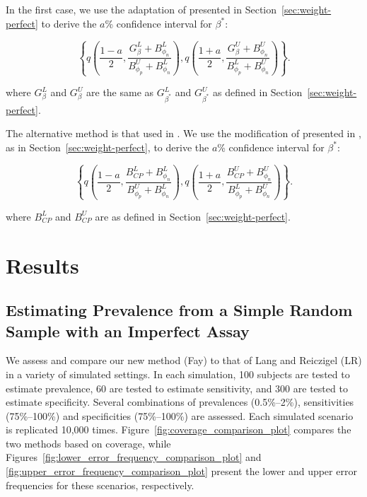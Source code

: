 \documentclass[AMA,STIX1COL]{WileyNJD-v2}
\begin{document}
In the first case, we use the adaptation of \cite{FayF:1997} presented in Section~\ref{sec:weight-perfect} to derive the \( a \)\% confidence interval for \( \beta^* \):

\begin{equation}
    \left\{ q \left( \frac{1 - a}{2}, \frac{G_{\beta}^L + B_{\phi_n}^L }{B_{\phi_p}^U + B_{\phi_n}^L }  \right),  q \left( \frac{1 + a}{2}, \frac{G_{\beta}^U + B_{\phi_n}^U}{B_{\phi_p}^L + B_{\phi_n}^U}  \right) \right\}.
\end{equation}

where \( G_{\beta}^L \) and \( G_{\beta}^U \) are the same as \( G_{\beta^*}^L \) and \( G_{\beta^*}^U \) as defined in Section~\ref{sec:weight-perfect}.

The alternative method is that used in \cite{Kali:2021}.
We use the  modification of \cite{Korn:1998} presented in \cite{Dean:2015}, as in Section~\ref{sec:weight-perfect}, to derive the \( a \)\% confidence interval for \( \beta^* \):

\begin{equation}
    \left\{ q \left( \frac{1 - a}{2}, \frac{B_{CP}^L + B_{\phi_n}^L }{B_{\phi_p}^U + B_{\phi_n}^L }  \right),  q \left( \frac{1 + a}{2}, \frac{B_{CP}^U + B_{\phi_n}^U}{B_{\phi_p}^L + B_{\phi_n}^U}  \right) \right\}.
\end{equation}

where \( B_{CP}^L \) and \( B_{CP}^U \) are as defined in Section~\ref{sec:weight-perfect}.

\section{Results}

\subsection{Estimating Prevalence from a Simple Random Sample with an Imperfect Assay}

We assess and compare our new method (Fay) to that of Lang and Reiczigel (LR) in a variety of simulated settings.
In each simulation, 100 subjects are tested to estimate prevalence, 60 are tested to estimate sensitivity, and 300 are tested to estimate specificity.
Several combinations of prevalences (0.5\%--2\%), sensitivities (75\%--100\%) and specificities (75\%--100\%) are assessed.
Each simulated scenario is replicated 10,000 times.
Figure~\ref{fig:coverage_comparison_plot} compares the two methods based on coverage, while Figures~\ref{fig:lower_error_frequency_comparison_plot} and \ref{fig:upper_error_frequency_comparison_plot} present the lower and upper error frequencies for these scenarios, respectively.
\end{document}
